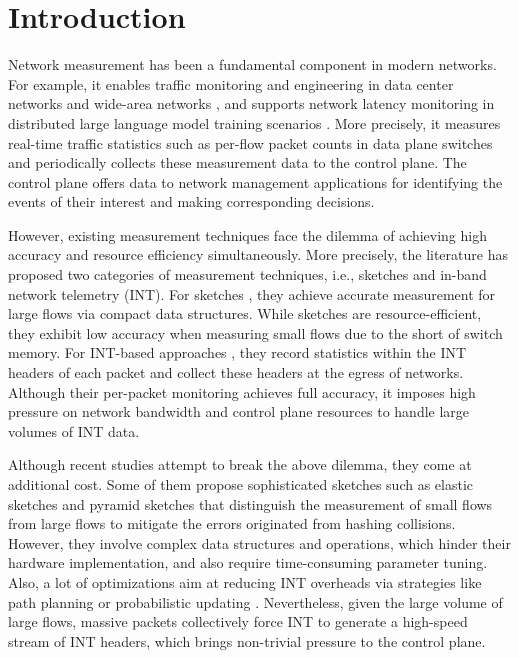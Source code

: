 \section{Introduction}

Network measurement has been a fundamental component in modern networks. For example, it enables traffic monitoring and engineering in data center networks \cite{li2016flowradar,woodruff2019measuring,zhang2017high} and wide-area networks \cite{huang2017sketchvisor,liu2016one,caida}, and supports network latency monitoring in distributed large language model training scenarios \cite{qian2024alibaba}. More precisely, it measures real-time traffic statistics such as per-flow packet counts in data plane switches and periodically collects these measurement data to the control plane. The control plane offers data to network management applications for identifying the events of their interest and making corresponding decisions. 

However, existing measurement techniques face the dilemma of achieving high accuracy and resource efficiency simultaneously. More precisely, the literature has proposed two categories of measurement techniques, i.e., sketches and in-band network telemetry (INT). For sketches \cite{li2016flowradar,yang2018elastic,huang2017sketchvisor,huang2018sketchlearn,liu2016one,huang2021toward,liu2019nitrosketch,zhang2021cocosketch,namkung2022sketchlib}, they achieve accurate measurement for large flows via compact data structures. While sketches are resource-efficient, they exhibit low accuracy when measuring small flows due to the short of switch memory. For INT-based approaches \cite{sheng2021deltaint,ben2020pint,handigol2014know,pan2019int,zhu2015packet}, they record statistics within the INT headers of each packet and collect these headers at the egress of networks. Although their per-packet monitoring achieves full accuracy, it imposes high pressure on network bandwidth and control plane resources to handle large volumes of INT data. 

Although recent studies attempt to break the above dilemma, they come at additional cost. Some of them propose sophisticated sketches such as elastic sketches \cite{yang2018elastic} and pyramid sketches \cite{yang2017pyramid} that distinguish the measurement of small flows from large flows to mitigate the errors originated from hashing collisions. However, they involve complex data structures and operations, which hinder their hardware implementation, and also require time-consuming parameter tuning. Also, a lot of optimizations aim at reducing INT overheads via strategies like path planning \cite{pan2019int} or probabilistic updating \cite{ben2020pint}. Nevertheless, given the large volume of large flows, massive packets collectively force INT to generate a high-speed stream of INT headers, which brings non-trivial pressure to the control plane. 

